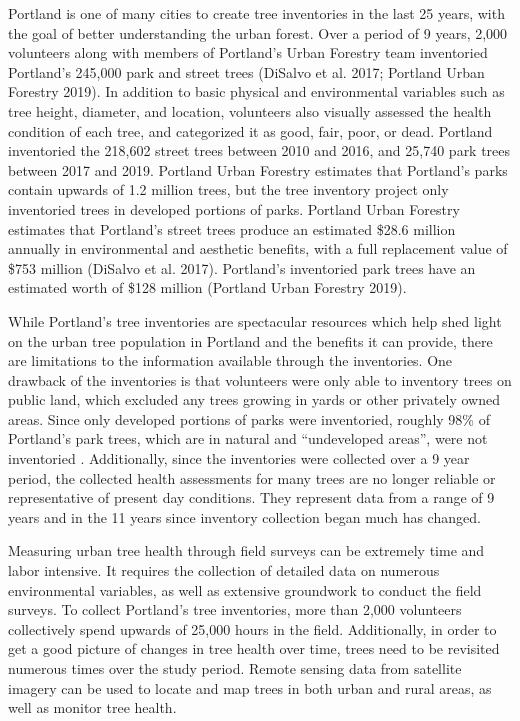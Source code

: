 \documentclass[12pt,twoside]{reedthesis}
\begin{document}
Portland is one of many cities to create tree inventories in the last 25
years, with the goal of better understanding the urban forest. Over a
period of 9 years, 2,000 volunteers along with members of Portland's
Urban Forestry team inventoried Portland's 245,000 park and street trees
(DiSalvo et al. 2017; Portland Urban Forestry 2019). In addition to basic
physical and environmental variables such as tree height, diameter, and
location, volunteers also visually assessed the health condition of each
tree, and categorized it as good, fair, poor, or dead. Portland
inventoried the 218,602 street trees between 2010 and 2016, and 25,740
park trees between 2017 and 2019. Portland Urban Forestry estimates that
Portland's parks contain upwards of 1.2 million trees, but the tree
inventory project only inventoried trees in developed portions of parks.
Portland Urban Forestry estimates that Portland's street trees produce
an estimated \$28.6 million annually in environmental and aesthetic
benefits, with a full replacement value of \$753 million (DiSalvo et al. 2017).
Portland's inventoried park trees have an estimated worth of \$128
million (Portland Urban Forestry 2019).

While Portland's tree inventories are spectacular resources which help
shed light on the urban tree population in Portland and the benefits it
can provide, there are limitations to the information available through
the inventories. One drawback of the inventories is that volunteers were
only able to inventory trees on public land, which excluded any trees
growing in yards or other privately owned areas. Since only developed
portions of parks were inventoried, roughly 98\% of Portland's park
trees, which are in natural and ``undeveloped areas'', were not
inventoried . Additionally, since the inventories were collected over a
9 year period, the collected health assessments for many trees are no
longer reliable or representative of present day conditions. They
represent data from a range of 9 years and in the 11 years since
inventory collection began much has changed.

Measuring urban tree health through field surveys can be extremely time
and labor intensive. It requires the collection of detailed data on
numerous environmental variables, as well as extensive groundwork to
conduct the field surveys. To collect Portland's tree inventories, more
than 2,000 volunteers collectively spend upwards of 25,000 hours in the
field. Additionally, in order to get a good picture of changes in tree
health over time, trees need to be revisited numerous times over the
study period. Remote sensing data from satellite imagery can be used to
locate and map trees in both urban and rural areas, as well as monitor
tree health.
\end{document}
